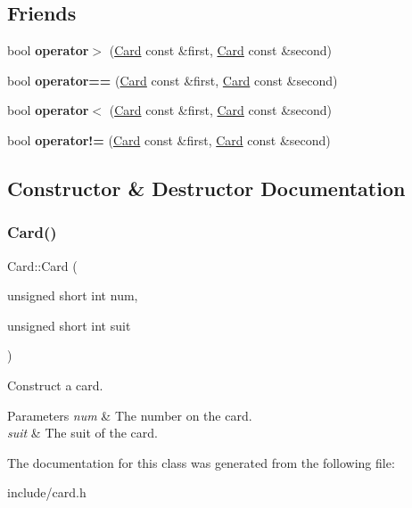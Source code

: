 \subsection*{Friends}
\begin{DoxyCompactItemize}
\item 
\mbox{\label{class_card_a5096257ae9d8273d4e47696c3faca770}} 
bool {\bfseries operator$>$} (\hyperlink{class_card}{Card} const \&first, \hyperlink{class_card}{Card} const \&second)
\item 
\mbox{\label{class_card_afe1cba0ed977eb5280d029f96b6da9cc}} 
bool {\bfseries operator==} (\hyperlink{class_card}{Card} const \&first, \hyperlink{class_card}{Card} const \&second)
\item 
\mbox{\label{class_card_a31c8c978ffb63cefe2bfe64b51644bad}} 
bool {\bfseries operator$<$} (\hyperlink{class_card}{Card} const \&first, \hyperlink{class_card}{Card} const \&second)
\item 
\mbox{\label{class_card_ae485e3400764685f4d5fc1cdb77b9030}} 
bool {\bfseries operator!=} (\hyperlink{class_card}{Card} const \&first, \hyperlink{class_card}{Card} const \&second)
\end{DoxyCompactItemize}


\subsection{Constructor \& Destructor Documentation}
\mbox{\label{class_card_ab1406a01ecfea3110f8e6188e11c4863}} 
\subsubsection{\texorpdfstring{Card()}{Card()}}
{\footnotesize\ttfamily Card\+::\+Card (\begin{DoxyParamCaption}\item[{unsigned short int}]{num,  }\item[{unsigned short int}]{suit }\end{DoxyParamCaption})}



Construct a card. 


\begin{DoxyParams}{Parameters}
{\em num} & The number on the card. \\
\hline
{\em suit} & The suit of the card. \\
\hline
\end{DoxyParams}


The documentation for this class was generated from the following file\+:\begin{DoxyCompactItemize}
\item 
include/card.\+h\end{DoxyCompactItemize}

